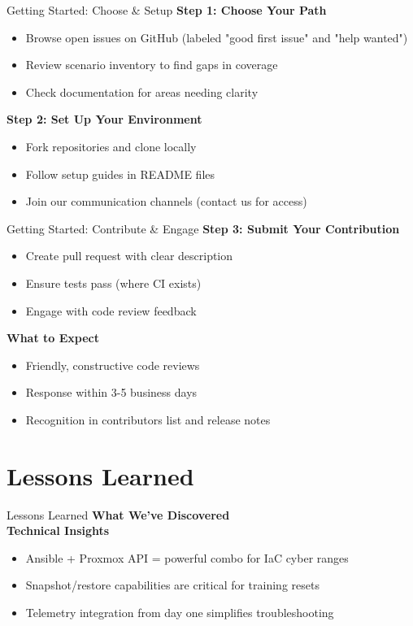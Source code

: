 \documentclass[aspectratio=169]{beamer}
\begin{document}
\begin{frame}{Getting Started: Choose \& Setup}
  \textbf{Step 1: Choose Your Path}
  \begin{itemize}
    \item Browse open issues on GitHub (labeled "good first issue" and "help wanted")
    \item Review scenario inventory to find gaps in coverage
    \item Check documentation for areas needing clarity
  \end{itemize}
  
  \textbf{Step 2: Set Up Your Environment}
  \begin{itemize}
    \item Fork repositories and clone locally
    \item Follow setup guides in README files
    \item Join our communication channels (contact us for access)
  \end{itemize}
\end{frame}

\begin{frame}{Getting Started: Contribute \& Engage}
  \textbf{Step 3: Submit Your Contribution}
  \begin{itemize}
    \item Create pull request with clear description
    \item Ensure tests pass (where CI exists)
    \item Engage with code review feedback
  \end{itemize}
  
  \textbf{What to Expect}
  \begin{itemize}
    \item Friendly, constructive code reviews
    \item Response within 3-5 business days
    \item Recognition in contributors list and release notes
  \end{itemize}
\end{frame}

\section{Lessons Learned}

\begin{frame}{Lessons Learned \; \faLightbulb}
  \textbf{What We've Discovered}\\[3mm]
  
  \textbf{Technical Insights}
  \begin{itemize}
    \item \alert{Ansible + Proxmox API = powerful combo} for IaC cyber ranges
    \item Snapshot/restore capabilities are critical for training resets
    \item Telemetry integration from day one simplifies troubleshooting
  \end{itemize}
\end{frame}
  
\end{document}
